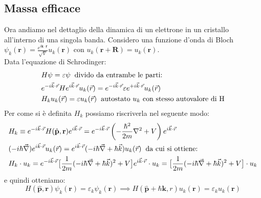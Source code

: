 \subsection{Massa efficace}
Ora andiamo nel dettaglio della dinamica di un elettrone in un cristallo all'interno di una singola banda. Considero una funzione d'onda di Bloch $\psi_k(\mathbf{r}) = \frac{e^{i\mathbf{k}\cdot \mathbf{r}}}{\sqrt{V}}u_k(\mathbf{r})$ con $u_k(\mathbf{r}+\mathbf{R}) = u_k(\mathbf{r})$. \\
Data l'equazione di Schrodinger: 
\begin{equation}
    \begin{split}
        &H\psi = \varepsilon\psi \hspace{0.2cm}\text{divido da entrambe le parti:}\\
        &e^{-i \vec{k} \cdot \vec{r}}H e^{i \vec{k} \cdot \vec{r}}u_k(\vec{r}) = e^{-i \vec{k} \cdot \vec{r}}\varepsilon e^{+i \vec{k} \cdot \vec{r}}u_k(\vec{r})\\
        &H_k u_k(\vec{r}) = \varepsilon u_k(\vec{r}) \hspace{0.2cm}\text{autostato $u_k$ con stesso autovalore di H}\\
    \end{split}
\end{equation}
Per come si è definita $H_k$ possiamo riscriverla nel seguente modo:
\begin{equation}\label{eqn:Hk}
    \begin{split}
        &H_k \equiv e^{-i \vec{k} \cdot \vec{r}} H( \hat{\mathbf{p}}, \mathbf{r})  e^{i\vec{k} \cdot \vec{r}} = e^{-i\vec{k}\cdot \vec{r}} \left( -\frac{\hbar^2}{2m}\nabla^2+V \right) e^{i\vec{k}\cdot \vec{r}}\\
        &(-i\hbar \vec{\nabla}) e^{i\vec{k}\cdot\vec{r}}u_k(\vec{r}) = e^{i\vec{k}\cdot \vec{r}}(-i\hbar\vec{\nabla}+\hbar \vec{k})u_k(\vec{r}) \hspace{0.2cm}\text{da cui si ottiene:}\\
        &H_k\cdot u_k = e^{-i\vec{k}\cdot\vec{r}} \bigl[\frac{1}{2m}(-i\hbar\vec{\nabla}+\hbar \vec{k})^2+V\bigr]e^{i\vec{k}\cdot\vec{r}}\cdot u_k=\bigl[\frac{1}{2m}(-i\hbar\vec{\nabla}+\hbar \vec{k})^2+V\bigr]\cdot u_k\\
    \end{split}
\end{equation}
e quindi otteniamo:
\[ H( \hat{\mathbf{p}}, \mathbf{r}) \psi_k(\mathbf{r}) = \varepsilon_k\psi_k(\mathbf{r}) \implies H( \hat{\mathbf{p}} + \hbar \mathbf{k}, r) u_k(\mathbf{r}) = \varepsilon_k u_k(\mathbf{r})\]
